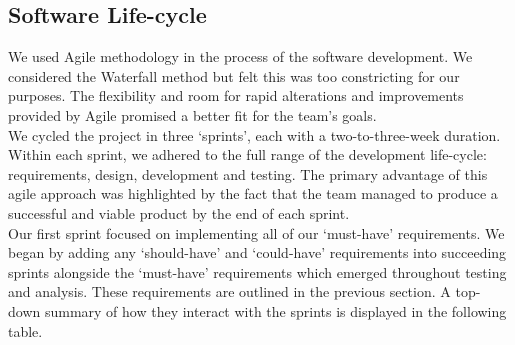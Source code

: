 \documentclass[11pt, english]{article}
\begin{document}
	\subsection{Software Life-cycle}

	We used Agile methodology in the process of the software development. We considered the Waterfall method but felt this was too constricting for our purposes. The flexibility and room for rapid alterations and improvements provided by Agile promised a better fit for the team's goals.\\

	We cycled the project in three `sprints', each with a two-to-three-week duration. Within each sprint, we adhered to the full range of the development life-cycle: requirements, design, development and testing. The primary advantage of this agile approach was highlighted by the fact that the team managed to produce a successful and viable product by the end of each sprint.\\

	Our first sprint focused on implementing all of our `must-have' requirements. We began by adding any `should-have' and `could-have' requirements into succeeding sprints alongside the `must-have' requirements which emerged throughout testing and analysis. These requirements are outlined in the previous section. A top-down summary of how they interact with the sprints is displayed in the following table.
\end{document}
